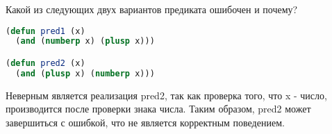 Какой из следующих двух вариантов предиката ошибочен и почему?

\begin{lstlisting}[language=Lisp]
(defun pred1 (x)
  (and (numberp x) (plusp x)))

(defun pred2 (x)
  (and (plusp x) (numberp x)))
\end{lstlisting}

Неверным является реализация pred2, так как проверка того, что x - число,
производится после проверки знака числа. Таким образом, pred2 может завершиться
с ошибкой, что не является корректным поведением.

